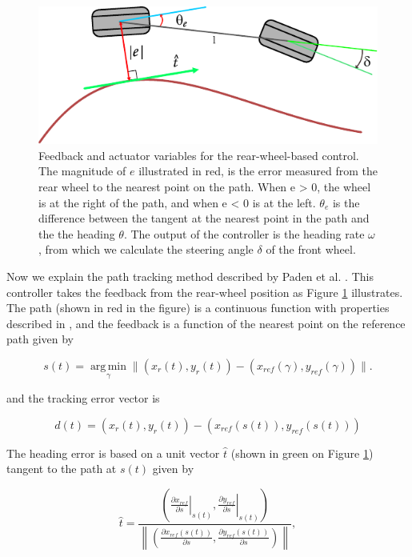 \documentclass[symmetry,article,submit,moreauthors,pdftex]{Definitions/mdpi}
\begin{document}
\begin{figure}[H] \includegraphics[width=10.5 cm]{img/path} \caption{ Feedback
        and actuator variables for the rear-wheel-based control. The magnitude
        of $e$ illustrated in red, is the error measured from the rear wheel to
        the nearest point on the path. When e > 0, the wheel is at the right of
        the path, and when e < 0 is at the left. $\theta_e$ is the
        difference between the tangent at the nearest point in the path and the
        the heading $\theta$. The output of the controller is the heading rate
        $\omega$, from which we calculate the steering angle $\delta$ of the front wheel.
}\label{fig:kinematics}    \end{figure} 

Now we explain the path tracking method described by Paden et al.
\cite{paden_survey_2016}.  This controller takes the feedback from the
rear-wheel position as Figure \ref{fig:kinematics} illustrates.  The path
(shown in red in the figure) is a continuous function with properties
described in \cite{samson1992path}, and the feedback is a function of the
nearest point on the reference path given by 

\begin{equation}
s(t) = \operatorname*{arg\,min}_{\gamma} \|(x_r(t),y_r(t)) - (x_{ref}(\gamma),y_{ref}(\gamma)) \|.
\end{equation}

and the tracking error vector is 

\begin{equation}
d(t) = (x_r(t),y_r(t))-(x_{ref}(s(t)),y_{ref}(s(t)))
\end{equation}

The heading error is based on a unit vector $\hat{t}$ (shown in green on Figure
\ref{fig:kinematics}) tangent to the path at $s(t)$ given by 

\begin{equation}
\hat{t} = \frac{ \left(\left.\frac{\partial x_{ref}}{\partial s} \right|_{s(t)},\left.\frac{\partial y_{ref}}{\partial s} \right|_{s(t)}\right)} 
              {\left\| \left(\frac{\partial x_{ref}(s(t))}{\partial s},\frac{\partial y_{ref}(s(t))}{\partial s}\right) \right\|},
\end{equation}
\end{document}
